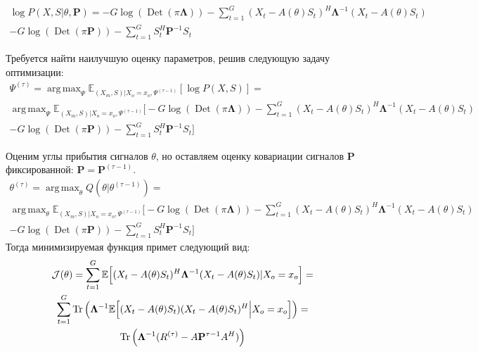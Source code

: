 \documentclass[11pt]{article}
\newcommand{\Expect}{\mathbb{E}}
\DeclareMathOperator*{\argmax}{arg \, \max}
\DeclareMathOperator{\Det}{Det}
\begin{document}
\\
\begin{equation*}
\begin{gathered}
\log P(X,S|\theta, \mathbf{P}) = -G \log (\Det(\pi \mathbf{\Lambda})) - \sum_{t=1}^G (X_t-A(\theta)S_t)^H \mathbf{\Lambda}^{-1}(X_t-A(\theta)S_t) 
\\ - G \log(\Det(\pi \mathbf{P})) - \sum_{t=1}^G S_t^H \mathbf{P}^{-1}S_t
\end{gathered}
\end{equation*}
\begin{center}
\fontsize{14}{18}\selectfont {}
\end{center}
Требуется найти наилучшую оценку параметров, решив следующую задачу оптимизации:
\begin{equation*}
\begin{gathered}
\Psi^{(\tau)}=\argmax_{\Psi} \Expect_{(X_m,S)|X_o=x_o, \Psi^{(\tau-1)}}[\log P(X, S)] = \\
\argmax_{\Psi} \Expect_{(X_m,S)|X_o=x_o, \Psi^{(\tau-1)}}\bigg[-G \log (\Det(\pi \mathbf{\Lambda})) - \sum_{t=1}^G (X_t-A(\theta)S_t)^H \mathbf{\Lambda}^{-1}(X_t-A(\theta)S_t) 
\\ - G \log(\Det(\pi \mathbf{P})) - \sum_{t=1}^G S_t^H \mathbf{P}^{-1}S_t\bigg]
\end{gathered}
\end{equation*}
\clearpage
\begin{center}
\fontsize{14}{18}\selectfont {}
\end{center}
Оценим углы прибытия сигналов $\theta$, но оставляем оценку ковариации сигналов $\mathbf{P}$ фиксированной: $\mathbf{P} = \mathbf{P}^{(\tau-1)}$.
\begin{equation*}
\begin{gathered}
\theta^{(\tau)}= \argmax_{\theta} Q(\theta | \theta^{(\tau-1)}) = \\
\argmax_{\theta} \Expect_{(X_m,S)|X_o=x_o, \Psi^{(\tau-1)}}\bigg[-G \log (\Det(\pi \mathbf{\Lambda})) - \sum_{t=1}^G (X_t-A(\theta)S_t)^H \mathbf{\Lambda}^{-1}(X_t-A(\theta)S_t) 
\\ - G \log(\Det(\pi \mathbf{P})) - \sum_{t=1}^G S_t^H \mathbf{P}^{-1}S_t\bigg]
\end{gathered}
\end{equation*}
Тогда минимизируемая функция примет следующий вид:
\begin{equation*}
\begin{gathered}
\mathcal{J}(\theta) = \sum_{t=1}^G \Expect \Big[ (X_t-A(\theta)S_t)^H\mathbf{\Lambda}^{-1}(X_t-A(\theta)S_t) \text{|}X_o = x_o\Big] = \\
\sum_{t=1}^G \Tr \Big( \mathbf{\Lambda}^{-1} \Expect \Big[ (X_t-A(\theta)S_t)(X_t-A(\theta)S_t)^H \Big{|}X_o = x_o \Big] \Big) = \\
\Tr \Big( \mathbf{\Lambda}^{-1} ({R}^{(\tau)} - A\mathbf{P}^{\tau-1}A^H) \Big)
\end{gathered}
\end{equation*}
\end{document}
